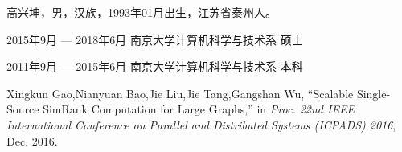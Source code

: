 \documentclass[master]{njuthesis}
\begin{document}
\nocite{*}

%
%



\begin{resume}
\begin{authorinfo}
\noindent 高兴坤，男，汉族，1993年01月出生，江苏省泰州人。
\end{authorinfo}
\begin{education}
\item[2015年9月 --- 2018年6月] 南京大学计算机科学与技术系 \hfill 硕士
\item[2011年9月 --- 2015年6月] 南京大学计算机科学与技术系 \hfill 本科
\end{education}
\begin{publications}
\item Xingkun Gao,Nianyuan Bao,Jie Liu,Jie Tang,Gangshan Wu, 
``Scalable Single-Source SimRank Computation for Large Graphs,'' in \textsl{Proc. 22nd IEEE International
    Conference on Parallel and Distributed Systems (ICPADS) 2016}, Dec. 2016.
\end{publications}

\end{resume}


\end{document}
